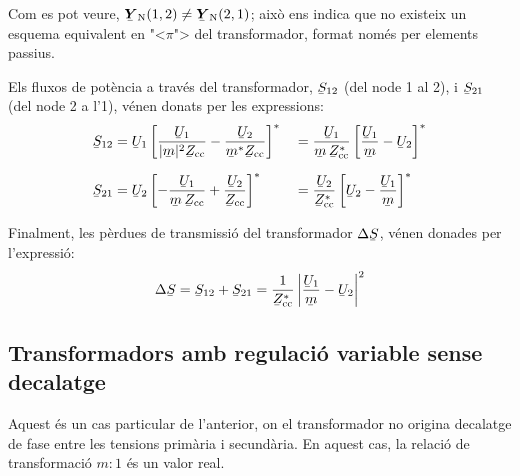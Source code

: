 Com es pot veure, $\mcmplx{Y}\ped{N}(1,2) \neq
\mcmplx{Y}\ped{N}(2,1)$; aix\`{o} ens indica que no existeix un esquema
equivalent en {"<}$\pi${">} del transformador, format nom\'{e}s per elements
passius.

Els fluxos de pot\`{e}ncia a trav\'{e}s del transformador, $\cmplx{S}_{12}$
(del node 1 al 2), i $\cmplx{S}_{21}$ (del node 2 a l'1), v\'{e}nen
donats per les expressions: 
\begin{alignat}{2}
   \cmplx{S}_{12} &= \cmplx{U}_1 \left[ \frac{\cmplx{U}_1}{|\cmplx{m}|^2 \cmplx{Z}\ped{cc}} - \frac{\cmplx{U}_2}{\cmplx{m}^* \cmplx{Z}\ped{cc}} \right]^* &&= \frac{\cmplx{U}_1}{\cmplx{m}\, \cmplx{Z}\ped{cc}^*} \left[ \frac{\cmplx{U}_1}{\cmplx{m}} - \cmplx{U}_2 \right]^* \label{eq:s12_trafo_reg_decal} \\[1.5ex]
   \cmplx{S}_{21} &= \cmplx{U}_2 \left[ - \frac{\cmplx{U}_1}{\cmplx{m} \,\cmplx{Z}\ped{cc}} + \frac{\cmplx{U}_2} {\cmplx{Z}\ped{cc}} \right]^* &&= \frac{\cmplx{U}_2}{\cmplx{Z}\ped{cc}^*} \left[  \cmplx{U}_2 - \frac{\cmplx{U}_1}{\cmplx{m}}  \right]^* \label{eq:s21_trafo_reg_decal}
\end{alignat}

Finalment, les p\`{e}rdues de transmissi\'{o} del transformador
$\Delta\cmplx{S}$, v\'{e}nen donades per l'expressi\'{o}:
\begin{equation} \label{eq:ds_trafo_reg_decal}
   \Delta\cmplx{S} = \cmplx{S}_{12} + \cmplx{S}_{21} = \frac{1}{\cmplx{Z}\ped{cc}^*}  \left|
    \frac{\cmplx{U}_1}{\cmplx{m}} - \cmplx{U}_2 \right|^2
\end{equation}


\subsection{Transformadors amb regulaci\'{o} variable sense decalatge} \label{sec:trafo_reg}

Aquest \'{e}s un cas particular de l'anterior, on el transformador no
origina decalatge de fase entre les tensions prim\`{a}ria i secund\`{a}ria.
En aquest cas, la relaci\'{o} de transformaci\'{o} $m : 1$ \'{e}s un valor real.

